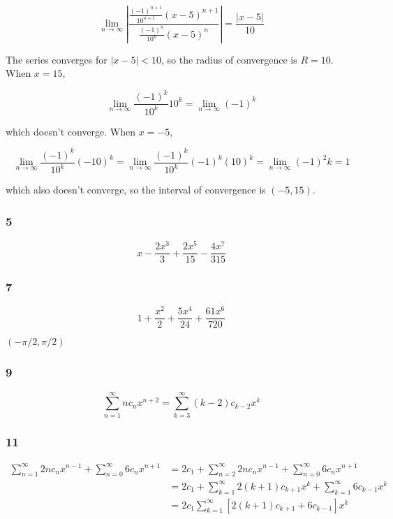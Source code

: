 \documentclass{article}
\begin{document}
\[\lim_{n \rightarrow \infty} \left| \frac{\frac{(-1)^{n + 1}}{10^{n + 1}} (x - 5)^{n + 1}}{\frac{(-1)^n}{10^n} (x - 5)^n} \right| = \frac{|x - 5|}{10}\]

The series converges for $|x - 5| < 10$, so the radius of convergence is $R = 10$. When $x = 15$,

\[\lim_{n \rightarrow \infty} \frac{(-1)^k}{10^k} 10^k = \lim_{n \rightarrow \infty} (-1)^k\]

which doesn't converge. When $x = -5$,

\[\lim_{n \rightarrow \infty} \frac{(-1)^k}{10^k} (-10)^k = \lim_{n \rightarrow \infty} \frac{(-1)^k}{10^k} (-1)^k (10)^k = \lim_{n \rightarrow \infty} (-1)^2k = 1\]

which also doesn't converge, so the interval of convergence is $(-5, 15)$.

\subsubsection{5}

\[x-\frac{2 x^3}{3}+\frac{2 x^5}{15}-\frac{4 x^7}{315}\]

\subsubsection{7}

\[1+\frac{x^2}{2}+\frac{5 x^4}{24}+\frac{61 x^6}{720}\]

$(-\pi / 2, \pi / 2)$

\subsubsection{9}

\[\sum_{n = 1}^\infty n c_n x^{n + 2} = \sum_{k = 3}^\infty (k - 2) c_{k - 2} x^k\]

\subsubsection{11}

\begin{align*}
  \sum_{n = 1}^\infty 2 n c_n x^{n - 1} + \sum_{n = 0}^\infty 6 c_n x^{n + 1} & = 2 c_1 + \sum_{n = 2}^\infty 2 n c_n x^{n - 1} + \sum_{n = 0}^\infty 6 c_n x^{n + 1}       \\
                                                                              & = 2 c_1 + \sum_{k = 1}^\infty 2 (k + 1) c_{k + 1} x^k + \sum_{k = 1}^\infty 6 c_{k - 1} x^k \\
                                                                              & = 2 c_1 \sum_{k = 1}^\infty [2 (k + 1) c_{k + 1} + 6 c_{k - 1}] x^k
\end{align*}
\end{document}
